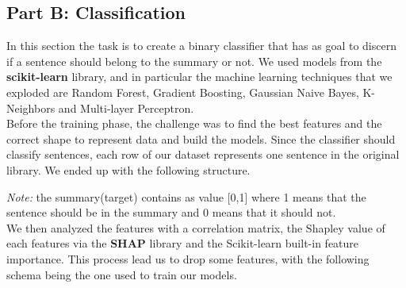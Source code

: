 \subsection*{Part B: Classification}
In this section the task is to create a binary classifier that has as goal to
discern if a sentence should belong to the summary or not. We used models from
the \textbf{scikit-learn} library, and in particular the machine learning
techniques that we exploded are Random Forest, Gradient Boosting, Gaussian
Naive Bayes, K-Neighbors and Multi-layer Perceptron. \\ Before the training
phase, the challenge was to find the best features and the correct shape to
represent data and build the models. Since the classifier should classify
sentences, each row of our dataset represents one sentence in the original
library. We ended up with the following structure.\\
\begin{table}[H]
\end{table}

\textit{Note:} the summary(target) contains as value [0,1] where 1 means that the sentence should be in the summary and 0 means that it should not.\\

We then analyzed the features with a correlation matrix, the Shapley value of each features via the \textbf{SHAP} library and the Scikit-learn built-in feature importance. This process lead us to drop some features, with the following schema being the one used to train our models.

\begin{table}[H]
\end{table}

